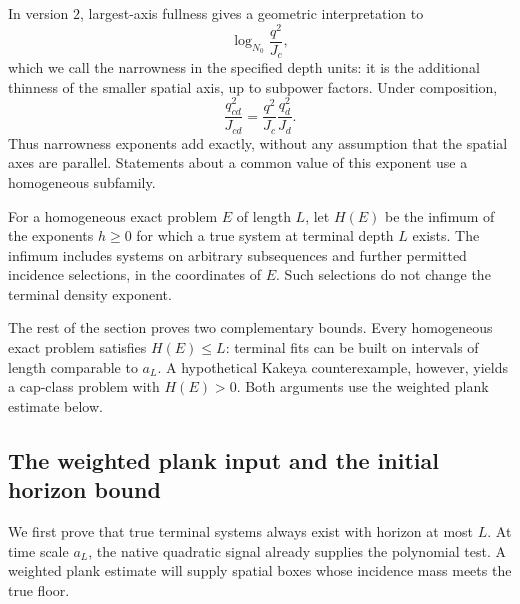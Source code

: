 In version \(2\), largest-axis fullness gives a geometric
interpretation to
\begin{equation}
 \log_{N_0}\frac{q^2}{J_c},
 \label{a01:narrowness}
\end{equation}
which we call the narrowness in the specified depth units:
it is the additional thinness of the smaller spatial axis,
up to subpower factors.
Under composition,
\[
 \frac{q_{cd}^2}{J_{cd}}
 =\frac{q^2}{J_c}\frac{q_d^2}{J_d}.
\]
Thus narrowness exponents add exactly, without any
assumption that the spatial axes are parallel.
Statements about a common value of this exponent use a
homogeneous subfamily.

\begin{definition}\label{def:horizon}
For a homogeneous exact problem \(E\) of length \(L\), let
\(H(E)\) be the infimum of the exponents \(h\ge0\) for which
a true system at terminal depth \(L\) exists.
The infimum includes systems on arbitrary subsequences
and further permitted incidence selections, in the
coordinates of \(E\).  Such selections do not change
the terminal density exponent.
\end{definition}

The rest of the section proves two complementary bounds.
Every homogeneous exact problem satisfies \(H(E)\le L\):
terminal fits can be built on intervals of length comparable to
\(a_L\).
A hypothetical Kakeya counterexample, however, yields a cap-class
problem with \(H(E)>0\). Both arguments use the weighted plank
estimate below.

\subsection{The weighted plank input and the initial horizon bound}

We first prove that true terminal systems always exist with horizon
at most \(L\). At time scale \(a_L\), the native quadratic signal
already supplies the polynomial test. A weighted plank estimate
will supply spatial boxes whose incidence mass meets the true floor.

